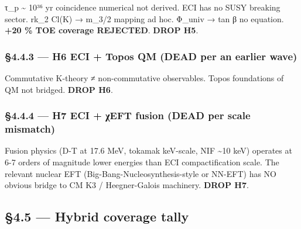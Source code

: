 \documentclass[
  11pt,
  a4paper,
]{article}
\begin{document}
τ\_p \textasciitilde{} 10³⁶ yr coincidence numerical not derived. ECI has no SUSY breaking sector. rk\_2 Cl(K) → m\_3/2 mapping ad hoc. Φ\_univ → tan β no equation. \textbf{+20 \% TOE coverage REJECTED}. \textbf{DROP H5}.

\hypertarget{h6-eci-topos-qm-dead-per-an earlier wave}{%
\subsubsection{§4.4.3 --- H6 ECI + Topos QM (DEAD per an earlier wave)}\label{h6-eci-topos-qm-dead-per-an earlier wave}}

Commutative K-theory ≠ non-commutative observables. Topos foundations of QM not bridged. \textbf{DROP H6}.

\hypertarget{h7-eci-ux3c7eft-fusion-dead-per-scale-mismatch}{%
\subsubsection{§4.4.4 --- H7 ECI + χEFT fusion (DEAD per scale mismatch)}\label{h7-eci-ux3c7eft-fusion-dead-per-scale-mismatch}}

Fusion physics (D-T at 17.6 MeV, tokamak keV-scale, NIF \textasciitilde10 keV) operates at 6-7 orders of magnitude lower energies than ECI compactification scale. The relevant nuclear EFT (Big-Bang-Nucleosynthesis-style or NN-EFT) has NO obvious bridge to CM K3 / Heegner-Galois machinery. \textbf{DROP H7}.

\hypertarget{hybrid-coverage-tally}{%
\subsection{§4.5 --- Hybrid coverage tally}\label{hybrid-coverage-tally}}
\end{document}
